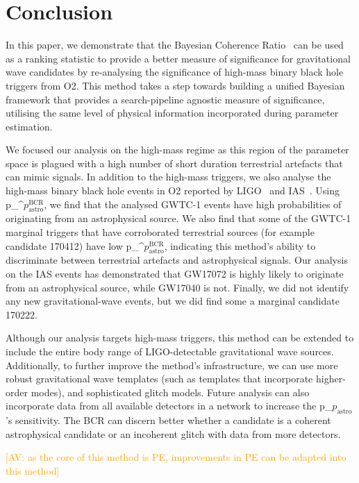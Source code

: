 \documentclass[%
 nofootinbib,
 amsmath,amssymb,
 aps,
 twocolumn
]{revtex4-2}
\newcommand{\fancytext}[1]{{\relax\ifmmode#1\else $#1$\fi}\xspace}
\newcommand{\pastro}{\fancytext{p_\text{astro}}}
\newcommand{\pastrobcr}{\fancytext{p_\text{astro}^{\text{BCR}}}}
\newcommand{\av}[1]{\textcolor{orange}{[AV: #1]}}
\begin{document}
\section{\label{sec:Conclusion}Conclusion}

In this paper, we demonstrate that the Bayesian Coherence Ratio~\cite{BCR1} can be used as a ranking statistic to provide a better measure of significance for gravitational wave candidates by re-analysing the significance of high-mass binary black hole triggers from O2. This method takes a step towards building a unified Bayesian framework that provides a search-pipeline agnostic measure of significance, utilising the same level of physical information incorporated during parameter estimation. 

We focused our analysis on the high-mass regime as this region of the parameter space is plagued with a high number of short duration terrestrial artefacts that can mimic signals. In addition to the high-mass triggers, we also analyse the high-mass binary black hole events in O2 reported by LIGO~\cite{GWTC1} and IAS~\cite{IAS1, IAS2}. Using \pastrobcr, we find that the analysed GWTC-1 events have high probabilities of originating from an astrophysical source. We also find that some of the GWTC-1 marginal triggers that have corroborated terrestrial sources (for example candidate 170412) have low \pastrobcr, indicating this method's ability to discriminate between terrestrial artefacts and astrophysical signals. Our analysis on the IAS events has demonstrated that GW17072 is highly likely to originate from an astrophysical source, while GW17040 is not. Finally, we did not identify any new gravitational-wave events, but we did find some a marginal candidate 170222. 

Although our analysis targets high-mass triggers, this method can be extended to include the entire body range of LIGO-detectable gravitational wave sources. Additionally, to further improve the method's infrastructure, we can use more robust gravitational wave templates (such as templates that incorporate higher-order modes), and sophisticated glitch models. Future analysis can also incorporate data from all available detectors in a network to increase the \pastro's sensitivity. The BCR can discern better whether a candidate is a coherent astrophysical candidate or an incoherent glitch with data from more detectors. 

\av{as the core of this method is PE, improvements in PE can be adapted into this method}
\end{document}
